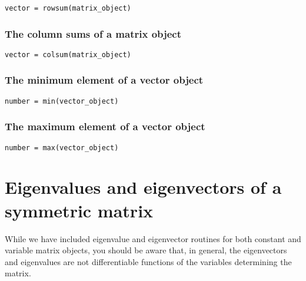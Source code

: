 \begin{lstlisting}
vector = rowsum(matrix_object)
\end{lstlisting}
\bigskip 


\subsubsection{The column sums of a matrix object}

\begin{lstlisting}
vector = colsum(matrix_object)
\end{lstlisting}
\bigskip 


\subsubsection{The minimum element of a vector object}

\begin{lstlisting}
number = min(vector_object)
\end{lstlisting}
\bigskip 


\subsubsection{The maximum element of a vector object}

\begin{lstlisting}
number = max(vector_object)
\end{lstlisting}
\bigskip 



\section{Eigenvalues and eigenvectors of a symmetric matrix}


While we have included eigenvalue and eigenvector routines for
both constant and variable matrix objects, you should be aware
that, in general, the eigenvectors and eigenvalues are not differentiable
functions of the variables determining the matrix.  

